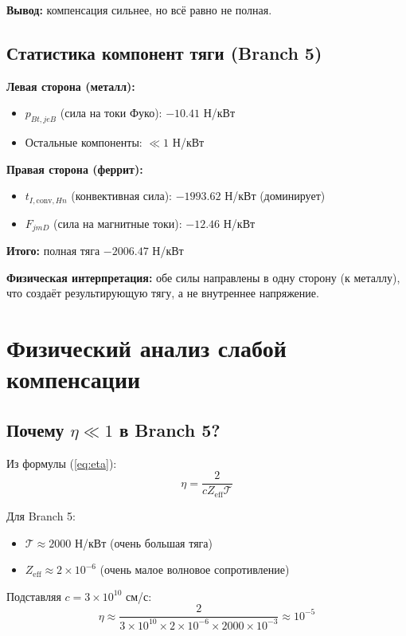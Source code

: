 \documentclass[a4paper,12pt]{article}
\begin{document}
\textbf{Вывод:} компенсация сильнее, но всё равно не полная.

\subsection{Статистика компонент тяги (Branch 5)}

\textbf{Левая сторона (металл):}
\begin{itemize}
    \item $p_{Bt,jeB}$ (сила на токи Фуко): $-10.41$ Н/кВт
    \item Остальные компоненты: $\ll 1$ Н/кВт
\end{itemize}

\textbf{Правая сторона (феррит):}
\begin{itemize}
    \item $t_{I,\text{conv},Hn}$ (конвективная сила): $-1993.62$ Н/кВт (доминирует)
    \item $F_{jmD}$ (сила на магнитные токи): $-12.46$ Н/кВт
\end{itemize}

\textbf{Итого:} полная тяга $-2006.47$ Н/кВт

\textbf{Физическая интерпретация:} обе силы направлены в одну сторону
(к металлу), что создаёт результирующую тягу, а не внутреннее напряжение.

\section{Физический анализ слабой компенсации}

\subsection{Почему $\eta \ll 1$ в Branch 5?}

Из формулы (\ref{eq:eta}):
\begin{equation}
\eta = \frac{2}{c Z_{\text{eff}} \mathcal{T}}
\end{equation}

Для Branch 5:
\begin{itemize}
    \item $\mathcal{T} \approx 2000$ Н/кВт (очень большая тяга)
    \item $Z_{\text{eff}} \approx 2 \times 10^{-6}$ (очень малое волновое
    сопротивление)
\end{itemize}

Подставляя $c = 3 \times 10^{10}$ см/с:
\begin{equation}
\eta \approx \frac{2}{3 \times 10^{10} \times 2 \times 10^{-6} \times 
2000 \times 10^{-3}} \approx 10^{-5}
\end{equation}
\end{document}
